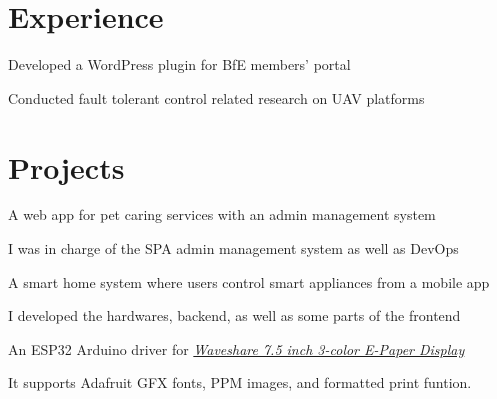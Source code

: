 \documentclass[]{deedy-resume-openfont}
\begin{document}
\begin{minipage}[t]{0.66\textwidth}


\section{Experience}
Developed a WordPress plugin for BfE members' portal
\sectionsep

Conducted fault tolerant control related research on UAV platforms
\sectionsep
\sectionsep
\sectionsep
\sectionsep


\section{Projects}
\vspace{\topsep} %
\begin{tightemize}
\item A web app for pet caring services with an admin management system
\item I was in charge of the SPA admin management system as well as DevOps
\end{tightemize}
\sectionsep

\vspace{\topsep} %
\begin{tightemize}
\item A smart home system where users control smart appliances from a mobile app
\item I developed the hardwares, backend, as well as some parts of the frontend
\end{tightemize}
\sectionsep

\vspace{\topsep} %
\begin{tightemize}
\item An ESP32 Arduino driver for \textit{\href{https://www.waveshare.com/wiki/7.5inch_HD_e-Paper_HAT}{Waveshare 7.5 inch 3-color E-Paper Display}}
\item It supports Adafruit GFX fonts, PPM images, and formatted print funtion.
\end{tightemize}
\sectionsep


\end{minipage}
\end{document}
